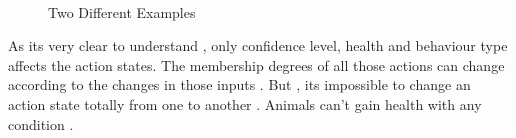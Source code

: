 \hfill



\newpage

\begin{figure}[ht]
  \\
  \caption{Two Different Examples}
  \label{fig:example}
\end{figure}


As its very clear to understand , only confidence level, health and behaviour type affects the action states. The membership degrees of all those actions can change according to the changes in those inputs . But , its impossible to change an action state totally from one to another . Animals can't gain health with any condition .
\newpage

